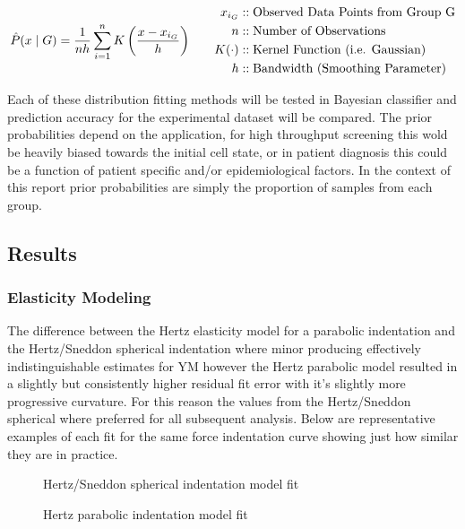 \documentclass[
  paper=a4,
  ,captions=tableheading
]{scrartcl}
\makeatletter
\newcommand*\pandocbounded[1]{%
  \sbox\pandoc@box{#1}%
  \Gscale@div\@tempa{\textheight}{\dimexpr\ht\pandoc@box+\dp\pandoc@box\relax}%
  \Gscale@div\@tempb{\linewidth}{\wd\pandoc@box}%
  \ifdim\@tempb\p@<\@tempa\p@\let\@tempa\@tempb\fi%
  \ifdim\@tempa\p@<\p@\scalebox{\@tempa}{\usebox\pandoc@box}%
  \else\usebox{\pandoc@box}%
  \fi%
}
\makeatother
\begin{document}
\[
{\large  
\hat{P}(x \mid G) =  
\frac{1}{n h} \sum_{i=1}^{n} K\left( \frac{x - x_{i_G}}{h} \right)  
}  
\qquad  
\begin{align}  
x_{i_G}           &:: \text{Observed Data Points from Group G}\\
n                 &:: \text{Number of Observations}\\
K(\cdot)          &:: \text{Kernel Function (i.e. Gaussian)}\\
h                 &:: \text{Bandwidth (Smoothing Parameter)}\\
\end{align}
\]

Each of these distribution fitting methods will be tested in Bayesian
classifier and prediction accuracy for the experimental dataset will be
compared. The prior probabilities depend on the application, for high
throughput screening this wold be heavily biased towards the initial
cell state, or in patient diagnosis this could be a function of patient
specific and/or epidemiological factors. In the context of this report
prior probabilities are simply the proportion of samples from each
group.

\subsection{Results}\label{results}

\subsubsection{Elasticity Modeling}\label{elasticity-modeling-1}

The difference between the Hertz elasticity model for a parabolic
indentation and the Hertz/Sneddon spherical indentation where minor
producing effectively indistinguishable estimates for YM however the
Hertz parabolic model resulted in a slightly but consistently higher
residual fit error with it's slightly more progressive curvature. For
this reason the values from the Hertz/Sneddon spherical where preferred
for all subsequent analysis. Below are representative examples of each
fit for the same force indentation curve showing just how similar they
are in practice.

\noindent
\begin{minipage}[t]{0.48\textwidth}
\begin{figure}
\centering
\pandocbounded{}
\caption{Hertz/Sneddon spherical indentation model fit}
\end{figure}
\end{minipage}
\hfill
\begin{minipage}[t]{0.48\textwidth}
\begin{figure}
\centering
\pandocbounded{}
\caption{Hertz parabolic indentation model fit}
\end{figure}
\end{minipage}
\end{document}
